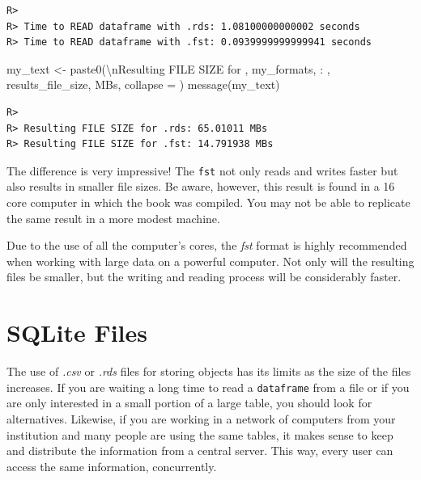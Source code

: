 \documentclass[
  12pt,
]{book}
\newenvironment{Shaded}{\begin{snugshade}}{\end{snugshade}}
\newcommand{\AttributeTok}[1]{\textcolor[rgb]{0.61,0.61,0.61}{#1}}
\newcommand{\FunctionTok}[1]{\textcolor[rgb]{0,0,0}{#1}}
\newcommand{\NormalTok}[1]{#1}
\newcommand{\OtherTok}[1]{\textcolor[rgb]{0.37,0.37,0.37}{#1}}
\newcommand{\SpecialCharTok}[1]{\textcolor[rgb]{0,0,0}{#1}}
\newcommand{\StringTok}[1]{\textcolor[rgb]{0.5,0.5,0.5}{#1}}
\newenvironment{rmdimportant}
{\begin{importantblock}
		
	} {\end{importantblock}}
\begin{document}
\begin{verbatim}
R> 
R> Time to READ dataframe with .rds: 1.08100000000002 seconds
R> Time to READ dataframe with .fst: 0.0939999999999941 seconds
\end{verbatim}

\begin{Shaded}
\begin{Highlighting}[]
\NormalTok{my\_text }\OtherTok{\textless{}{-}} \FunctionTok{paste0}\NormalTok{(}\StringTok{\textquotesingle{}}\SpecialCharTok{\textbackslash{}n}\StringTok{Resulting FILE SIZE for \textquotesingle{}}\NormalTok{,}
\NormalTok{                  my\_formats, }\StringTok{\textquotesingle{}: \textquotesingle{}}\NormalTok{,}
\NormalTok{                  results\_file\_size, }\StringTok{\textquotesingle{} MBs\textquotesingle{}}\NormalTok{, }\AttributeTok{collapse =} \StringTok{\textquotesingle{}\textquotesingle{}}\NormalTok{)}
\FunctionTok{message}\NormalTok{(my\_text)}
\end{Highlighting}
\end{Shaded}

\begin{verbatim}
R> 
R> Resulting FILE SIZE for .rds: 65.01011 MBs
R> Resulting FILE SIZE for .fst: 14.791938 MBs
\end{verbatim}

The difference is very impressive! The \texttt{fst} not only reads and writes faster but also results in smaller file sizes. Be aware, however, this result is found in a 16 core computer in which the book was compiled. You may not be able to replicate the same result in a more modest machine.

\begin{rmdimportant}
Due to the use of all the computer's cores, the \emph{fst} format is
highly recommended when working with large data on a powerful computer.
Not only will the resulting files be smaller, but the writing and
reading process will be considerably faster.
\end{rmdimportant}

\hypertarget{sqlite-files}{%
\section{SQLite Files}\label{sqlite-files}}

The use of \emph{.csv} or \emph{.rds} files for storing objects has its limits as the size of the files increases. If you are waiting a long time to read a \texttt{dataframe} from a file or if you are only interested in a small portion of a large table, you should look for alternatives. Likewise, if you are working in a network of computers from your institution and many people are using the same tables, it makes sense to keep and distribute the information from a central server. This way, every user can access the same information, concurrently.
\end{document}

